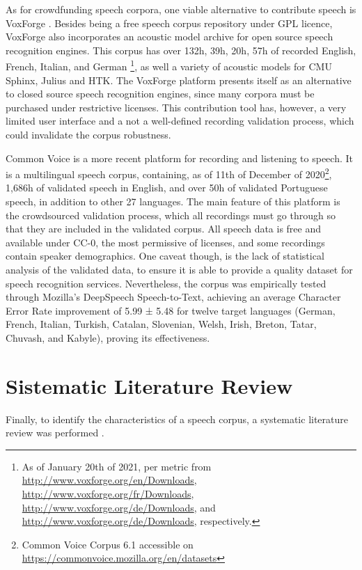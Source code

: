 As for crowdfunding speech corpora, one viable alternative to contribute speech is VoxForge \cite{voxforge}. Besides being a free speech corpus repository under GPL licence, VoxForge also incorporates an acoustic model archive for open source speech recognition engines. This corpus has over 132h, 39h, 20h, 57h of recorded English, French, Italian, and German \footnote{As of January 20th of 2021, per metric from \url{http://www.voxforge.org/en/Downloads}, \url{http://www.voxforge.org/fr/Downloads}, \url{http://www.voxforge.org/de/Downloads}, and \url{http://www.voxforge.org/de/Downloads}, respectively.}, as well a variety of acoustic models for CMU Sphinx, Julius and HTK. The VoxForge platform presents itself as an alternative to closed source speech recognition engines, since many corpora must be purchased under restrictive licenses. This contribution tool has, however, a very limited user interface and a not a well-defined recording validation process, which could invalidate the corpus robustness.

Common Voice \cite{ardila2019common} is a more recent platform for recording and listening to speech. It is a multilingual speech corpus, containing, as of 11th of December of 2020\footnote{Common Voice Corpus 6.1 accessible on  \url{https://commonvoice.mozilla.org/en/datasets}}, 1,686h of validated speech in English, and over 50h of validated Portuguese speech, in addition to other 27 languages. The main feature of this platform is the crowdsourced validation process, which all recordings must go through so that they are included in the validated corpus. All speech data is free and available under CC-0, the most permissive of licenses, and some recordings contain speaker demographics. One caveat though, is the lack of statistical analysis of the validated data, to ensure it is able to provide a quality dataset for speech recognition services. Nevertheless, the corpus was empirically tested through Mozilla’s DeepSpeech Speech-to-Text, achieving an average Character Error Rate improvement of 5.99 ± 5.48 for twelve target languages (German, French, Italian, Turkish, Catalan, Slovenian, Welsh, Irish, Breton, Tatar, Chuvash, and Kabyle), proving its effectiveness.

\section*{Sistematic Literature Review}
Finally, to identify the characteristics of a speech corpus, a systematic literature review was performed \cite{kitchenham2009systematic}.


